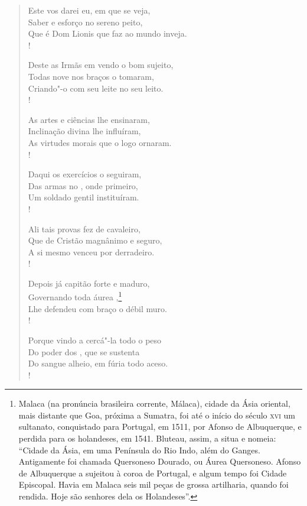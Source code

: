 \begin{verse}
Este vos darei eu, em que se veja,\\
Saber e esforço no sereno peito,\\
Que é Dom Lionis que faz ao mundo inveja.\\! %

Deste as Irmãs em vendo o bom sujeito,\\
Todas nove nos braços o tomaram,\\
Criando"-o com seu leite no seu leito.\\!

As artes e ciências lhe ensinaram,\\
Inclinação divina lhe influíram,\\
As virtudes morais que o logo ornaram.\\!
 
Daqui os exercícios o seguiram,\\
Das armas no , onde primeiro,\\
Um soldado gentil instituíram.\\!

Ali tais provas fez de cavaleiro,\\
Que de Cristão magnânimo e seguro,\\
A si mesmo venceu por derradeiro.\\!

Depois já capitão forte e maduro,\\
Governando toda áurea ,\footnote{ Malaca (na pronúncia
brasileira corrente, Málaca), cidade da Ásia oriental, mais distante
que Goa, próxima a Sumatra, foi até o início do século \textsc{xvi} um
sultanato, conquistado para Portugal, em 1511, por Afonso de
Albuquerque, e perdida para os holandeses, em 1541. Bluteau, assim, a
situa e nomeia: ``Cidade da Ásia, em uma Península do Rio
Indo, além do Ganges. Antigamente foi chamada Quersoneso Dourado, ou
Áurea Quersoneso. Afonso de Albuquerque a sujeitou à coroa de
Portugal, e algum tempo foi Cidade Episcopal. Havia em Malaca seis mil
peças de grossa artilharia, quando foi rendida. Hoje são senhores dela os Holandeses''.}\\
Lhe defendeu com braço o débil muro.\\!

Porque vindo a cercá"-la todo o peso\\
Do poder dos , que se sustenta\\
Do sangue alheio, em fúria todo aceso.\\!


\end{verse}
